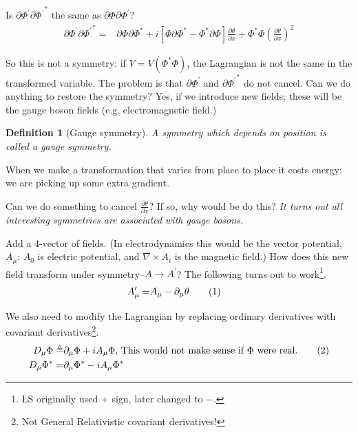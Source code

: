 \documentclass[]{article}
\newcommand\numberthis{\addtocounter{equation}{1}\tag{\theequation}}
\newtheorem{defn}[thm]{Definition}
\begin{document}
Is $\partial \Phi^\prime \partial {\Phi^\prime}^*$ the same as $\partial \Phi \partial {\Phi^\prime}$?
\begin{align*}
\partial \Phi^\prime \partial {\Phi^\prime}^* =&\partial \Phi \partial \Phi^* + i[\Phi \partial \Phi^* -\Phi^* \partial \Phi]\frac{\partial \theta}{\partial x} + \Phi^* \Phi (\frac{\partial \theta}{\partial x})^2
\end{align*}

So this is not a symmetry: if $V=V(\Phi^*\Phi)$, the Lagrangian is not the same in the transformed variable.  The problem is that $\partial \Phi^\prime$ and $\partial {\Phi^\prime}^*$ do not cancel. Can we do anything to restore the symmetry? Yes, if we introduce new fields; these will be the gauge boson fields (e.g. electromagnetic field.)

\begin{defn}[Gauge symmetry]
	A symmetry which depends on position is called a gauge symmetry.
\end{defn}

When we make a transformation that varies from place to place it costs energy: we are picking up some extra gradient.

Can we do something to cancel $\frac{\partial \theta}{\partial x}$? If so, why would be do this? \emph{It turns out all interesting symmetries are associated with gauge bosons.}

Add a 4-vector of fields. (In electrodynamics this would be the vector potential, $A_\mu$: $A_0$ is electric potential, and $\nabla \times A_i$ is the magnetic field.) How does this new field transform under symmetry--$A \rightarrow A^\prime$? The following turns out to work\footnote{LS originally used $+$ sign, later changed to $-$.}.
\begin{align*}
	A^\prime_\mu =& A_\mu - \partial_\mu \theta \numberthis \label{eq:gauge:field}
\end{align*}

We also need to modify the Lagrangian by replacing ordinary derivatives with covariant derivatives\footnote{Not General Relativistic covariant derivatives!}.
\begin{align*}
	D_\mu \Phi \triangleq& \partial_\mu \Phi + i A_\mu \Phi \text{, This would not make sense if $\Phi$ were real.} \numberthis \label{eq:covariant:derivative}\\
	D_\mu \Phi^* =& \partial_\mu \Phi^* - i A_\mu \Phi^*
\end{align*}
\end{document}
